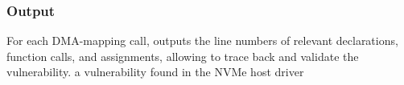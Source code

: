 
\subsubsection{Output}
%
For each DMA-mapping call, \tool outputs the line numbers of relevant declarations, function calls, and assignments, allowing \DIFdelbegin {}\DIFdelend \DIFaddbegin {}\DIFaddend to trace back and validate the vulnerability. \DIFdelbegin {}\DIFdelend \DIFaddbegin {}\DIFaddend a vulnerability found in the NVMe host driver\DIFdelbegin {}\DIFdelend \DIFaddbegin {}\DIFaddend 

